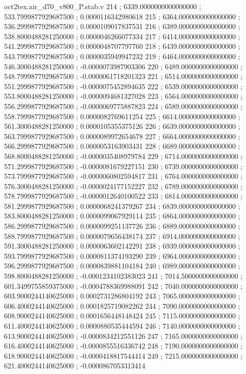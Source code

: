 \begin{filecontents}[overwrite]{oct2tex.air_d70_v800_P.stab.v}
214 ; 6339.0000000000000000 ; 533.7999877929687500 ; 0.0000116342980618
215 ; 6364.0000000000000000 ; 536.2999877929687500 ; 0.0000109017837531
216 ; 6389.0000000000000000 ; 538.8000488281250000 ; 0.0000046266077334
217 ; 6414.0000000000000000 ; 541.2999877929687500 ; 0.0000048707797760
218 ; 6439.0000000000000000 ; 543.7999877929687500 ; 0.0000035949947232
219 ; 6464.0000000000000000 ; 546.3000488281250000 ; -0.0000073987903306
220 ; 6489.0000000000000000 ; 548.7999877929687500 ; -0.0000061718201323
221 ; 6514.0000000000000000 ; 551.2999877929687500 ; -0.0000075452894635
222 ; 6539.0000000000000000 ; 553.8000488281250000 ; -0.0000094681327028
223 ; 6564.0000000000000000 ; 556.2999877929687500 ; -0.0000069775887823
224 ; 6589.0000000000000000 ; 558.7999877929687500 ; 0.0000082769611254
225 ; 6614.0000000000000000 ; 561.3000488281250000 ; 0.0000105355375126
226 ; 6639.0000000000000000 ; 563.7999877929687500 ; 0.0000089972654678
227 ; 6664.0000000000000000 ; 566.2999877929687500 ; 0.0000053163903431
228 ; 6689.0000000000000000 ; 568.8000488281250000 ; -0.0000035408979784
229 ; 6714.0000000000000000 ; 571.2999877929687500 ; -0.0000081679227151
230 ; 6739.0000000000000000 ; 573.7999877929687500 ; -0.0000060802594817
231 ; 6764.0000000000000000 ; 576.3000488281250000 ; -0.0000024177152227
232 ; 6789.0000000000000000 ; 578.7999877929687500 ; -0.0000012640100522
233 ; 6814.0000000000000000 ; 581.2999877929687500 ; 0.0000068241379267
234 ; 6839.0000000000000000 ; 583.8000488281250000 ; 0.0000099067929114
235 ; 6864.0000000000000000 ; 586.2999877929687500 ; 0.0000099251137726
236 ; 6889.0000000000000000 ; 588.7999877929687500 ; 0.0000079656438174
237 ; 6914.0000000000000000 ; 591.3000488281250000 ; 0.0000063602142291
238 ; 6939.0000000000000000 ; 593.7999877929687500 ; 0.0000811374193290
239 ; 6964.0000000000000000 ; 596.2999877929687500 ; 0.0000839881104184
240 ; 6989.0000000000000000 ; 598.8000488281250000 ; -0.0001234102383023
241 ; 7014.5000000000000000 ; 601.3499755859375000 ; -0.0004788369988091
242 ; 7040.0000000000000000 ; 603.9000244140625000 ; 0.0002731286804192
243 ; 7065.0000000000000000 ; 606.4000244140625000 ; 0.0001825719082262
244 ; 7090.0000000000000000 ; 608.9000244140625000 ; 0.0001656448148424
245 ; 7115.0000000000000000 ; 611.4000244140625000 ; 0.0000880535444594
246 ; 7140.0000000000000000 ; 613.9000244140625000 ; -0.0000834212551126
247 ; 7165.0000000000000000 ; 616.4000244140625000 ; -0.0000855516336742
248 ; 7190.0000000000000000 ; 618.9000244140625000 ; -0.0000418817544414
249 ; 7215.0000000000000000 ; 621.4000244140625000 ; -0.0000867053313414

\end{filecontents}
